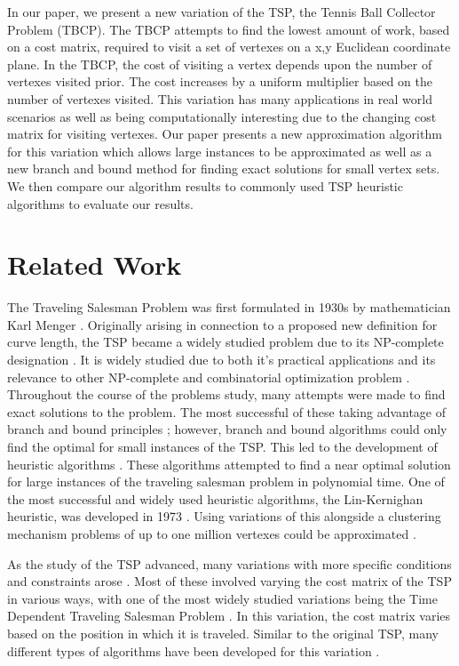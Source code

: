 \documentclass[sigconf, anonymous, pdftex]{acmart}
\begin{document}
In our paper, we present a new variation of the TSP, the Tennis Ball Collector Problem (TBCP). The TBCP attempts to find the lowest amount of work, based on a cost matrix, required to visit a set of vertexes on a x,y Euclidean coordinate plane. In the TBCP, the cost of visiting a vertex depends upon the number of vertexes visited prior. The cost increases by a uniform multiplier based on the number of vertexes visited. This variation has many applications in real world scenarios as well as being computationally interesting due to the changing cost matrix for visiting vertexes. Our paper presents a new approximation algorithm for this variation which allows large instances to be approximated as well as a new branch and bound method for finding exact solutions for small vertex sets. We then compare our algorithm results to commonly used TSP heuristic algorithms to evaluate our results.

\section{Related Work}

The Traveling Salesman Problem was first formulated in 1930s by mathematician Karl Menger \cite{tspHistory}. Originally arising in connection to a proposed new definition for curve length, the TSP became a widely studied problem due to its NP-complete designation \cite{pVsNp}. It is widely studied due to both it's practical applications and its relevance to other NP-complete and combinatorial optimization problem \cite{tspAll}. Throughout the course of the problems study, many attempts were made to find exact solutions to the problem. The most successful of these taking advantage of branch and bound principles \cite{bbAlgorithmsGeneral}\cite{branch&boundBasics}\cite{branchBoundTSP}; however, branch and bound algorithms could only find the optimal for small instances of the TSP. This led to the development of heuristic algorithms \cite{tspAlgorithms}\cite{approximateTSP}. These algorithms attempted to find a near optimal solution for large instances of the traveling salesman problem in polynomial time. One of the most successful and widely used heuristic algorithms, the Lin-Kernighan heuristic, was developed in 1973 \cite{lkHeuristic}. Using variations of this alongside a clustering mechanism problems of up to one million vertexes could be approximated \cite{dcClusteringMillionTSP}.

As the study of the TSP advanced, many variations with more specific conditions and constraints arose \cite{tspAll}. Most of these involved varying the cost matrix of the TSP in various ways, with one of the most widely studied variations being the Time Dependent Traveling Salesman Problem \cite{tdtspDefinition}. In this variation, the cost matrix varies based on the position in which it is traveled. Similar to the original TSP, many different types of algorithms have been developed for this variation \cite{tdtspOptimalGenerator}\cite{dpTDTSP}.
\end{document}
